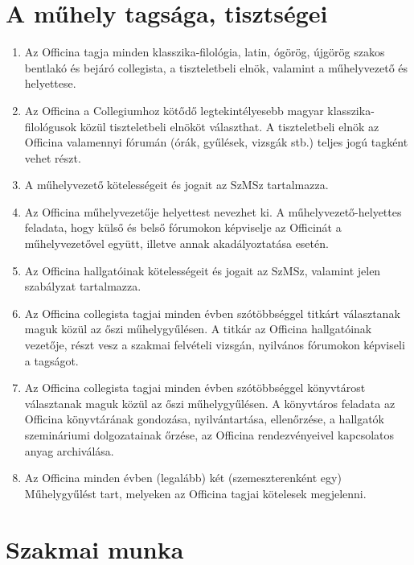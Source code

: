 \documentclass{rulebook}
\begin{document}
\section{A műhely tagsága, tisztségei}

\begin{enumerate}
	\item Az Officina tagja minden klasszika-filológia, latin, ógörög, újgörög szakos bentlakó és bejáró collegista, a tiszteletbeli elnök, valamint a műhelyvezető és helyettese.
	\item Az Officina a Collegiumhoz kötődő legtekintélyesebb magyar klasszika-filológusok közül tiszteletbeli elnököt választhat. A tiszteletbeli elnök az Officina valamennyi fórumán (órák, gyűlések, vizsgák stb.) teljes jogú tagként vehet részt.
	\item A műhelyvezető kötelességeit és jogait az SzMSz tartalmazza.
	\item Az Officina műhelyvezetője helyettest nevezhet ki. A műhelyvezető-helyettes feladata, hogy külső és belső fórumokon képviselje az Officinát a műhelyvezetővel együtt, illetve annak akadályoztatása esetén.
	\item Az Officina hallgatóinak kötelességeit és jogait az SzMSz, valamint jelen szabályzat tartalmazza. 
	\item Az Officina collegista tagjai minden évben szótöbbséggel titkárt választanak maguk közül az őszi műhelygyűlésen. A titkár az Officina hallgatóinak vezetője, részt vesz a szakmai felvételi vizsgán, nyilvános fórumokon képviseli a tagságot.
	\item Az Officina collegista tagjai minden évben szótöbbséggel könyvtárost választanak maguk közül az őszi műhelygyűlésen. A könyvtáros feladata az Officina könyvtárának gondozása, nyilvántartása, ellenőrzése, a hallgatók szemináriumi dolgozatainak őrzése, az Officina rendezvényeivel kapcsolatos anyag archiválása.
	\item Az Officina minden évben (legalább) két (szemeszterenként egy) Műhelygyűlést tart, melyeken az Officina tagjai kötelesek megjelenni.
\end{enumerate}


\section{Szakmai munka}
\end{document}
